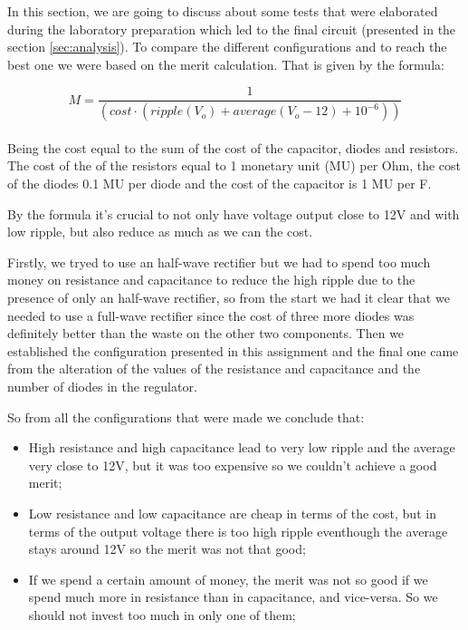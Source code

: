 In this section, we are going to discuss about some tests that were elaborated during the laboratory preparation which led to the final circuit (presented in the section \ref{sec:analysis}). 
To compare the different configurations and to reach the best one we were based on the merit calculation. That is given by the formula: 

\begin{equation}
M=\frac{1}{(cost\cdot(ripple(V_o)+average(V_{o}-12)+10^{-6}))}
\end{equation}
\\

Being the cost equal to the sum of the cost of the capacitor, diodes and resistors.
The cost of the of the resistors equal to 1 monetary unit (MU) per Ohm, the cost of the diodes 0.1 MU per diode and the cost of the capacitor is 1 MU per {\textmu}F.

By the formula it's crucial to not only have voltage output close to 12V and with low ripple, but also reduce as much as we can the cost. 
\par Firstly, we tryed to use an half-wave rectifier but we had to spend too much money on resistance and capacitance to reduce the high ripple due to the presence of only an half-wave rectifier,
so from the start we had it clear that we needed to use a full-wave rectifier since the cost of three more diodes was definitely better than the waste on the other two components.
Then we established the configuration presented in this assignment and the final one came from the alteration of the values of the resistance and capacitance and the number of diodes in the regulator. 
\par So from all the configurations that were made we conclude that:
\begin{itemize}
\item High resistance and high capacitance lead to very low ripple and the average very close to 12V, but it was too expensive so we couldn't achieve a good merit;
\item Low resistance and low capacitance are cheap in terms of the cost, but in terms of the output voltage there is too high ripple eventhough the average stays around 12V so the merit was not that good;
\item If we spend a certain amount of money, the merit was not so good if we spend much more in resistance than in capacitance, and vice-versa. So we should not invest too much in only one of them;
\end{itemize}

